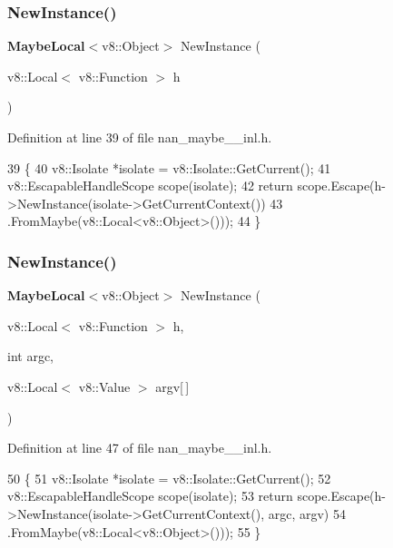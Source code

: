 \subsubsection{New\+Instance()\hspace{0.1cm}{\footnotesize\ttfamily [1/3]}}
{\footnotesize\ttfamily \textbf{ Maybe\+Local}$<$v8\+::\+Object$>$ New\+Instance (\begin{DoxyParamCaption}\item[{v8\+::\+Local$<$ v8\+::\+Function $>$}]{h }\end{DoxyParamCaption})}



Definition at line 39 of file nan\+\_\+maybe\+\_\+\_\+inl.\+h.


\begin{DoxyCode}
39                                                         \{
40   v8::Isolate *isolate = v8::Isolate::GetCurrent();
41   v8::EscapableHandleScope scope(isolate);
42   \textcolor{keywordflow}{return} scope.Escape(h->NewInstance(isolate->GetCurrentContext())
43                           .FromMaybe(v8::Local<v8::Object>()));
44 \}
\end{DoxyCode}
\mbox{\label{nan__maybe__43__inl_8h_a6dc33c09ee8a0a78a8cb0fef44fb15a9}} 
\subsubsection{New\+Instance()\hspace{0.1cm}{\footnotesize\ttfamily [2/3]}}
{\footnotesize\ttfamily \textbf{ Maybe\+Local}$<$v8\+::\+Object$>$ New\+Instance (\begin{DoxyParamCaption}\item[{v8\+::\+Local$<$ v8\+::\+Function $>$}]{h,  }\item[{int}]{argc,  }\item[{v8\+::\+Local$<$ v8\+::\+Value $>$}]{argv[$\,$] }\end{DoxyParamCaption})}



Definition at line 47 of file nan\+\_\+maybe\+\_\+\_\+inl.\+h.


\begin{DoxyCode}
50                                \{
51   v8::Isolate *isolate = v8::Isolate::GetCurrent();
52   v8::EscapableHandleScope scope(isolate);
53   \textcolor{keywordflow}{return} scope.Escape(h->NewInstance(isolate->GetCurrentContext(), argc, argv)
54                           .FromMaybe(v8::Local<v8::Object>()));
55 \}
\end{DoxyCode}
\mbox{\label{nan__maybe__43__inl_8h_a9cdbb9c2f0045d4cb27ce2b637540f96}} 
